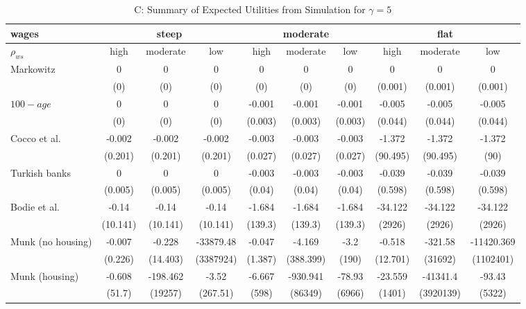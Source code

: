 \documentclass[]{elsarticle}
\begin{document}
\begin{table}[h!]\ContinuedFloat
	\centering
	\caption{C: Summary of Expected Utilities from Simulation for $\gamma=5$}
	\label{table:util}
	\begin{tabular}[c]{|l|ccc|ccc|ccc|}
		\hline
		 wages& \multicolumn{3}{c|}{steep} & \multicolumn{3}{c|}{moderate} & \multicolumn{3}{c|}{flat}\\
		\hline
		$\rho_{ws}$&high&moderate&low&high&moderate&low&high&moderate&low\\
		\hline
Markowitz					&0&0&0&0&0&0&0&0&0\\
							&(0)&(0)&(0)&(0)&(0)&(0)&(0.001)&(0.001)&(0.001)\\
$100-age$					&0&0&0&-0.001&-0.001&-0.001&-0.005&-0.005&-0.005\\
							&(0)&(0)&(0)&(0.003)&(0.003)&(0.003)&(0.044)&(0.044)&(0.044)\\
Cocco et al.				&-0.002&-0.002&-0.002&-0.003&-0.003&-0.003&-1.372&-1.372&-1.372\\
							&(0.201)&(0.201)&(0.201)&(0.027)&(0.027)&(0.027)&(90.495)&(90.495)&(90)\\
Turkish banks			 	&0&0&0&-0.003&-0.003&-0.003&-0.039&-0.039&-0.039\\
							&(0.005)&(0.005)&(0.005)&(0.04)&(0.04)&(0.04)&(0.598)&(0.598)&(0.598)\\
Bodie et al.			 	&-0.14&-0.14&-0.14&-1.684&-1.684&-1.684&-34.122&-34.122&-34.122\\
							&(10.141)&(10.141)&(10.141)&(139.3)&(139.3)&(139.3)&(2926)&(2926)&(2926)\\
Munk (no housing)			&-0.007&-0.228&-33879.48&-0.047&-4.169&-3.2&-0.518&-321.58&-11420.369\\
							&(0.226)&(14.403)&(3387924)&(1.387)&(388.399)&(190)&(12.701)&(31692)&(1102401)\\
Munk (housing)				&-0.608&-198.462&-3.52&-6.667&-930.941&-78.93&-23.559&-41341.4&-93.43\\
							&(51.7)&(19257)&(267.51)&(598)&(86349)&(6966)&(1401)&(3920139)&(5322)\\
	\hline
	\end{tabular}
\end{table}
\end{document}
